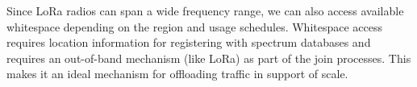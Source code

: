 Since LoRa radios can span a wide frequency range, we can also access available whitespace depending on the region and usage schedules.  Whitespace access requires location information for registering with spectrum databases and requires an out-of-band mechanism (like LoRa) as part of the join processes.  This makes it an ideal mechanism for offloading traffic in support of scale.







